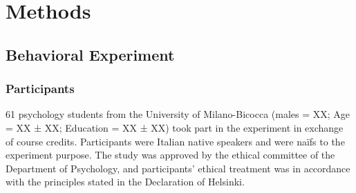 \section{Methods}

\subsection{Behavioral Experiment}
\subsubsection{Participants}
61 psychology students from the University of Milano-Bicocca (males = XX; Age = XX ± XX; Education = XX ± XX) took part in the experiment in exchange of course credits. Participants were Italian native speakers and were naïfs to the experiment purpose. The study was approved by the ethical committee of the Department of Psychology, and participants’ ethical treatment was in accordance with the principles stated in the Declaration of Helsinki.

